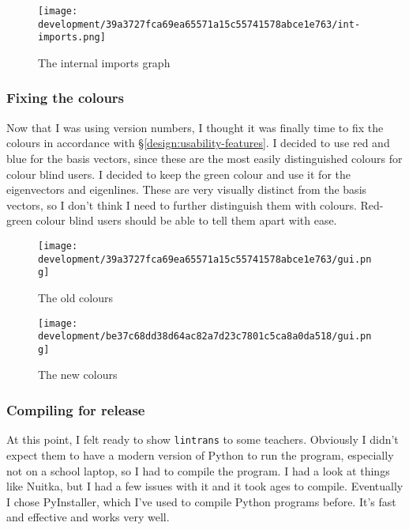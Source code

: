 \documentclass[../development.tex]{subfiles}
\begin{document}
\begin{figure}[H]
	\centering
	\texttt{[image: development/39a3727fca69ea65571a15c55741578abce1e763/int-imports.png]}
	\caption{The internal imports graph}
	\label{fig:development:39a3727fca69ea65571a15c55741578abce1e763:int-imports.png}
\end{figure}

\subsubsection{Fixing the colours\label{development:fumbling-with-semver:fixing-the-colours}}

Now that I was using version numbers, I thought it was finally time to fix the colours in accordance with \S\ref{design:usability-features}. I decided to use red and blue for the basis vectors, since these are the most easily distinguished colours for colour blind users. I decided to keep the green colour and use it for the eigenvectors and eigenlines. These are very visually distinct from the basis vectors, so I don't think I need to further distinguish them with colours. Red-green colour blind users should be able to tell them apart with ease.

\begin{figure}[H]
	\centering
	\texttt{[image: development/39a3727fca69ea65571a15c55741578abce1e763/gui.png]}
	\caption{The old colours}
	\label{fig:development:39a3727fca69ea65571a15c55741578abce1e763:gui.png}
\end{figure}

\begin{figure}[H]
	\centering
	\texttt{[image: development/be37c68dd38d64ac82a7d23c7801c5ca8a0da518/gui.png]}
	\caption{The new colours}
	\label{fig:development:be37c68dd38d64ac82a7d23c7801c5ca8a0da518:gui.png}
\end{figure}

\subsubsection{Compiling for release\label{development:fumbling-with-semver:compiling-for-release}}

At this point, I felt ready to show \texttt{lintrans} to some teachers. Obviously I didn't expect them to have a modern version of Python to run the program, especially not on a school laptop, so I had to compile the program. I had a look at things like Nuitka\cite{nuitka-docs}, but I had a few issues with it and it took ages to compile. Eventually I chose PyInstaller\cite{pyinstaller-4.10-docs}, which I've used to compile Python programs before. It's fast and effective and works very well.
\end{document}
